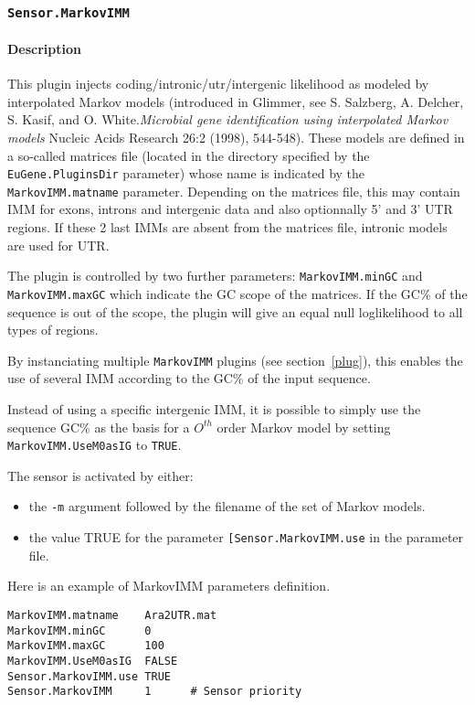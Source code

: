 
\subsubsection{\texttt{Sensor.MarkovIMM}}

\paragraph{Description}

This plugin injects coding/intronic/utr/intergenic likelihood as
modeled by interpolated Markov models (introduced in Glimmer, see S. Salzberg, A. Delcher, S. Kasif, and O. White.{\em Microbial gene identification using interpolated Markov models} Nucleic Acids Research 26:2 (1998), 544-548). These
models are defined in a so-called matrices file (located in the
directory specified by the \texttt{EuGene.PluginsDir} parameter) whose
name is indicated by the \texttt{MarkovIMM.matname}
parameter. Depending on the matrices file, this may contain IMM for
exons, introns and intergenic data and also optionnally 5' and 3' UTR
regions. If these 2 last IMMs are absent from the matrices file,
intronic models are used for UTR.

The plugin is controlled by two further parameters:
\texttt{MarkovIMM.minGC} and \texttt{MarkovIMM.maxGC} which indicate
the GC scope of the matrices. If the GC\% of the sequence is out of
the scope, the plugin will give an equal null loglikelihood to all types
of regions.

By instanciating multiple \texttt{MarkovIMM} plugins (see
section~\ref{plug}), this enables the use of several IMM according to
the GC\% of the input sequence. 

Instead of using a specific intergenic IMM, it is possible to simply
use the sequence GC\% as the basis for a $O^{th}$ order Markov model
by setting \texttt{MarkovIMM.UseM0asIG} to \texttt{TRUE}.

The sensor is activated by either:
\begin{itemize}
\item the \texttt{-m} argument followed by the filename of the set of Markov models.
\item the value TRUE for the parameter \texttt{[Sensor.MarkovIMM.use} in
  the parameter file.
\end{itemize}

Here is an example of MarkovIMM parameters definition.
\begin{Verbatim}[fontsize=\small]
MarkovIMM.matname    Ara2UTR.mat
MarkovIMM.minGC      0
MarkovIMM.maxGC      100
MarkovIMM.UseM0asIG  FALSE
Sensor.MarkovIMM.use TRUE
Sensor.MarkovIMM     1      # Sensor priority
\end{Verbatim}


